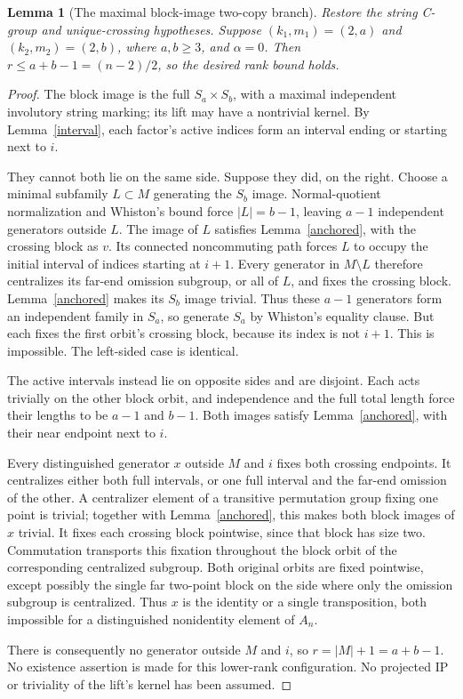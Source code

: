 \documentclass[11pt,a4paper]{article}
\newtheorem{lemma}{Lemma}
\begin{document}
\begin{lemma}[The maximal block-image two-copy branch]\label{maxcopy}
Restore the string C-group and unique-crossing hypotheses.
Suppose $(k_1,m_1)=(2,a)$ and $(k_2,m_2)=(2,b)$, where
$a,b\geq3$, and $\alpha=0$. Then
$r\leq a+b-1=(n-2)/2$, so the desired rank bound holds.
\end{lemma}
\begin{proof}
The block image is the full $S_a\times S_b$, with a maximal
independent involutory string marking; its lift may have a
nontrivial kernel. By Lemma~\ref{interval}, each factor's active
indices form an interval ending or starting next to $i$.

They cannot both lie on the same side. Suppose they did, on the
right. Choose a minimal subfamily $L\subset M$ generating the
$S_b$ image. Normal-quotient normalization and Whiston's bound
force $|L|=b-1$, leaving $a-1$ independent generators outside
$L$. The image of $L$ satisfies Lemma~\ref{anchored}, with the
crossing block as $v$. Its connected noncommuting path forces
$L$ to occupy the initial interval of indices starting at $i+1$.
Every generator in $M\setminus L$ therefore centralizes its
far-end omission subgroup, or all of $L$, and fixes the crossing
block. Lemma~\ref{anchored} makes its $S_b$ image trivial.
Thus these $a-1$ generators form an independent family in $S_a$,
so generate $S_a$ by Whiston's equality clause. But each fixes
the first orbit's crossing block, because its index is not
$i+1$. This is impossible. The left-sided case is identical.

The active intervals instead lie on opposite sides and are
disjoint. Each acts trivially on the other block orbit, and
independence and the full total length force their lengths to
be $a-1$ and $b-1$. Both images satisfy Lemma~\ref{anchored},
with their near endpoint next to $i$.

Every distinguished generator $x$ outside $M$ and $i$ fixes
both crossing endpoints. It centralizes either both full
intervals, or one full interval and the far-end omission of the
other. A centralizer element of a transitive permutation group
fixing one point is trivial; together with Lemma~\ref{anchored},
this makes both block images of $x$ trivial. It fixes each
crossing block pointwise, since that block has size two.
Commutation transports this fixation throughout the block orbit
of the corresponding centralized subgroup. Both original orbits
are fixed pointwise, except possibly the single far two-point
block on the side where only the omission subgroup is centralized.
Thus $x$ is the identity or a single transposition, both impossible
for a distinguished nonidentity element of $A_n$.

There is consequently no generator outside $M$ and $i$, so
$r=|M|+1=a+b-1$. No existence assertion is made for this
lower-rank configuration. No projected IP or triviality of the
lift's kernel has been assumed.
\end{proof}
\end{document}
